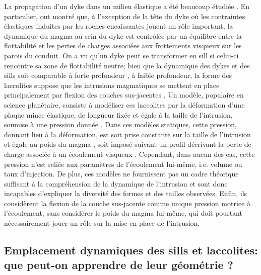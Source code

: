 La  propagation d'un  dyke dans  un  milieu élastique  a été  beaucoup
étudiée    \citep{Lister:1991ut,Rubin:1995upa}.     En    particulier,
\citet{Lister:1991ut} ont montré que, à l'exception de la tête du dyke
où  les contraintes  élastiques induites  par les  roches encaissantes
jouent un  rôle important, la dynamique  du magma au sein  du dyke est
contrôlée  par un  équilibre entre  la flottabilité  et les  pertes de
charges associées aux frottements visqueux  sur les parois du conduit.
On a vu  qu'un dyke peut se transformer en  sill si celui-ci rencontre
sa zone de flottabilité neutre; bien que la dynamique des dykes et des
sills       soit       comparable       à       forte       profondeur
\citep{Lister:1991ut,Cruden:tg},  à faible  profondeur,  la forme  des
laccolites suppose que les intrusions  magmatiques se mettent en place
principalement     par     flexion    des     couches     sus-jacentes
\citep{Johnson:1973ho}.  Un  modèle, populaire en  science planétaire,
consiste à  modéliser ces laccolites  par la déformation  d'une plaque
mince  élastique,  de   longueur  fixée  et  égale  à   la  taille  de
l'intrusion,  soumise à  une  pression donnée  \citep{Pollard:1973ho}.
Dans  ces  modèles  statiques,  cette  pression,  donnant  lieu  à  la
déformation, est soit prise constante  sur la taille de l'intrusion et
égale             au             poids            du             magma
\citep{Pollard:1973ho,Wichman:1996bj,Jozwiak:2012dq},    soit   imposé
suivant  un  profil  décrivant  la  perte  de  charge  associée  à  un
écoulement visqueux \citep{Kerr:1998eo,Wohler:2009jj}. Cependant, dans
aucun  des  cas,  cette  pression   n’est  reliée  aux  paramètres  de
l’écoulement lui-même, i.e. volume ou  taux d’injection.  De plus, ces
modèles  ne  fournissent  pas  un   cadre  théorique  suffisant  à  la
compréhension de la  dynamique de l'intrusion et  sont donc incapables
d'expliquer la diversité  des formes et des  tailles observées. Enfin,
ils  considèrent la  flexion  de la  couche  sus-jacente comme  unique
pression motrice  à l'écoulement,  sans considérer  le poids  du magma
lui-même, qui doit  pourtant nécessairement jouer un rôle  sur la mise
en place de l'intrusion.

\subsection{Emplacement  dynamiques  des   sills  et  laccolites:  que
  peut-on apprendre de leur géométrie ?}
\label{sec:empl-dynam-des}

